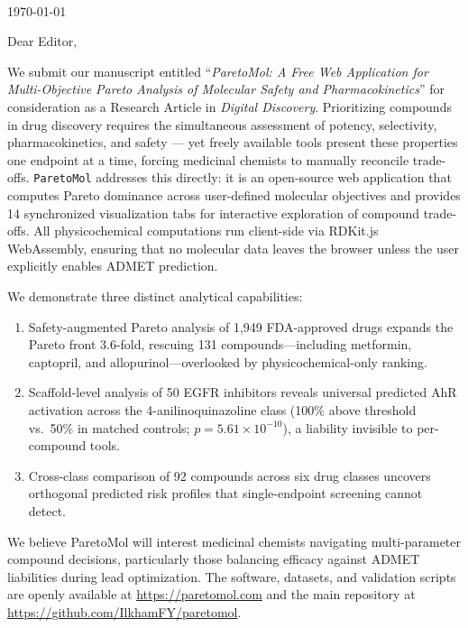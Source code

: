 \documentclass{article}
\begin{document}
$\;$\\
\vspace{-0.3cm}

\begin{flushright}
\today
\end{flushright}

\vspace{-0.1cm}
Dear Editor,\\
\vspace{0.2cm}


We submit our manuscript entitled ``\emph{ParetoMol: A Free Web Application for Multi-Objective Pareto Analysis of Molecular Safety and Pharmacokinetics}'' for consideration as a Research Article in \emph{Digital Discovery}.
Prioritizing compounds in drug discovery requires the simultaneous assessment of potency, selectivity, pharmacokinetics, and safety — yet freely available tools present these properties one endpoint at a time, forcing medicinal chemists to manually reconcile trade-offs. \texttt{ParetoMol} addresses this directly: it is an open-source web application that computes Pareto dominance across user-defined molecular objectives and provides 14 synchronized visualization tabs for interactive exploration of compound trade-offs. All physicochemical computations run client-side via RDKit.js WebAssembly, ensuring that no molecular data leaves the browser unless the user explicitly enables ADMET prediction.

We demonstrate three distinct analytical capabilities:
\begin{enumerate}
\itemsep-0.3em
    \item Safety-augmented Pareto analysis of 1,949 FDA-approved drugs expands the Pareto front 3.6-fold, rescuing 131 compounds---including metformin, captopril, and allopurinol---overlooked by physicochemical-only ranking.
    \item Scaffold-level analysis of 50 EGFR inhibitors reveals universal predicted AhR activation across the 4-anilinoquinazoline class (100\% above threshold vs.\ 50\% in matched controls; $p = 5.61 \times 10^{-10}$), a liability invisible to per-compound tools.
    \item Cross-class comparison of 92 compounds across six drug classes uncovers orthogonal predicted risk profiles that single-endpoint screening cannot detect.
\end{enumerate}

We believe ParetoMol will interest medicinal chemists navigating multi-parameter compound decisions, particularly those balancing efficacy against ADMET liabilities during lead optimization. The software, datasets, and validation scripts are openly available at \url{https://paretomol.com} and the main repository at \url{https://github.com/IlkhamFY/paretomol}.\\
\end{document}

